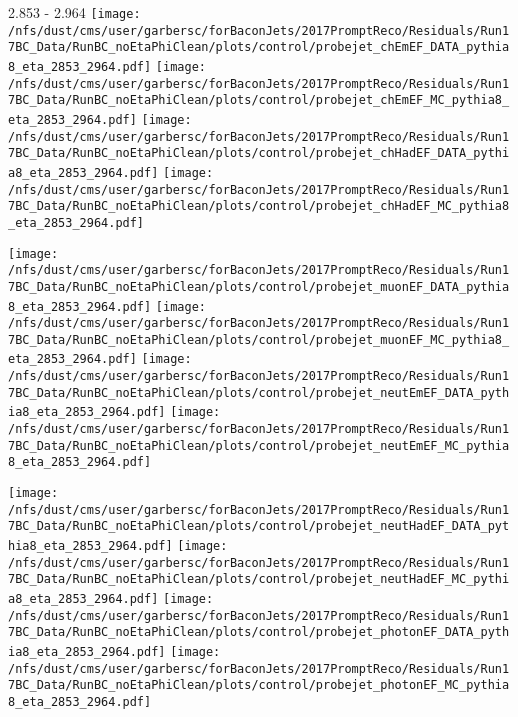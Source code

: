 \documentclass[t,compress]{beamer}
\begin{document}
\begin{frame}{2.853 - 2.964}
	\texttt{[image: /nfs/dust/cms/user/garbersc/forBaconJets/2017PromptReco/Residuals/Run17BC\_Data/RunBC\_noEtaPhiClean/plots/control/probejet\_chEmEF\_DATA\_pythia8\_eta\_2853\_2964.pdf]}
	\texttt{[image: /nfs/dust/cms/user/garbersc/forBaconJets/2017PromptReco/Residuals/Run17BC\_Data/RunBC\_noEtaPhiClean/plots/control/probejet\_chEmEF\_MC\_pythia8\_eta\_2853\_2964.pdf]}
	\texttt{[image: /nfs/dust/cms/user/garbersc/forBaconJets/2017PromptReco/Residuals/Run17BC\_Data/RunBC\_noEtaPhiClean/plots/control/probejet\_chHadEF\_DATA\_pythia8\_eta\_2853\_2964.pdf]}
	\texttt{[image: /nfs/dust/cms/user/garbersc/forBaconJets/2017PromptReco/Residuals/Run17BC\_Data/RunBC\_noEtaPhiClean/plots/control/probejet\_chHadEF\_MC\_pythia8\_eta\_2853\_2964.pdf]}
\newline

\vspace{-0.65cm}
	\texttt{[image: /nfs/dust/cms/user/garbersc/forBaconJets/2017PromptReco/Residuals/Run17BC\_Data/RunBC\_noEtaPhiClean/plots/control/probejet\_muonEF\_DATA\_pythia8\_eta\_2853\_2964.pdf]}
	\texttt{[image: /nfs/dust/cms/user/garbersc/forBaconJets/2017PromptReco/Residuals/Run17BC\_Data/RunBC\_noEtaPhiClean/plots/control/probejet\_muonEF\_MC\_pythia8\_eta\_2853\_2964.pdf]}
	\texttt{[image: /nfs/dust/cms/user/garbersc/forBaconJets/2017PromptReco/Residuals/Run17BC\_Data/RunBC\_noEtaPhiClean/plots/control/probejet\_neutEmEF\_DATA\_pythia8\_eta\_2853\_2964.pdf]}
	\texttt{[image: /nfs/dust/cms/user/garbersc/forBaconJets/2017PromptReco/Residuals/Run17BC\_Data/RunBC\_noEtaPhiClean/plots/control/probejet\_neutEmEF\_MC\_pythia8\_eta\_2853\_2964.pdf]}
\newline

\vspace{-0.65cm}
	\texttt{[image: /nfs/dust/cms/user/garbersc/forBaconJets/2017PromptReco/Residuals/Run17BC\_Data/RunBC\_noEtaPhiClean/plots/control/probejet\_neutHadEF\_DATA\_pythia8\_eta\_2853\_2964.pdf]}
	\texttt{[image: /nfs/dust/cms/user/garbersc/forBaconJets/2017PromptReco/Residuals/Run17BC\_Data/RunBC\_noEtaPhiClean/plots/control/probejet\_neutHadEF\_MC\_pythia8\_eta\_2853\_2964.pdf]}
	\texttt{[image: /nfs/dust/cms/user/garbersc/forBaconJets/2017PromptReco/Residuals/Run17BC\_Data/RunBC\_noEtaPhiClean/plots/control/probejet\_photonEF\_DATA\_pythia8\_eta\_2853\_2964.pdf]}
	\texttt{[image: /nfs/dust/cms/user/garbersc/forBaconJets/2017PromptReco/Residuals/Run17BC\_Data/RunBC\_noEtaPhiClean/plots/control/probejet\_photonEF\_MC\_pythia8\_eta\_2853\_2964.pdf]}
\end{frame}
\end{document}
